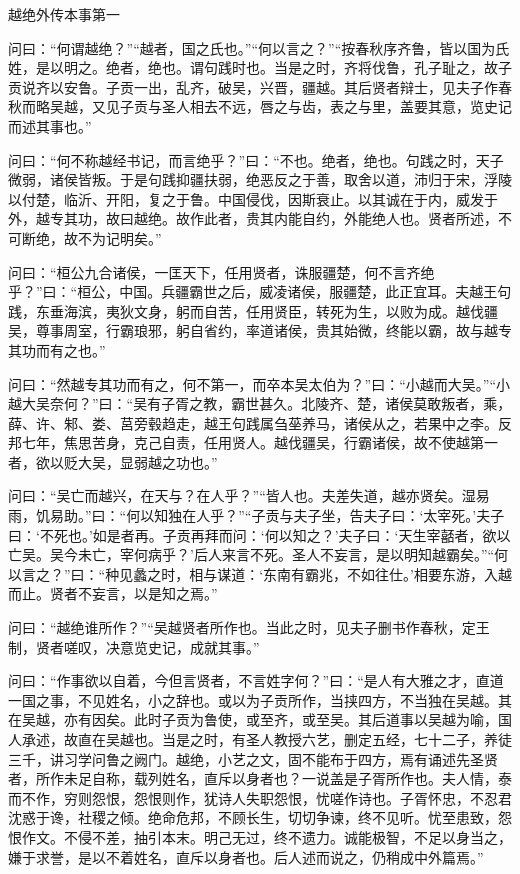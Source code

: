 \documentclass[12pt,UTF8]{ctexbook}
\begin{document}
越绝外传本事第一

问曰：“何谓越绝？”“越者，国之氏也。”“何以言之？”“按春秋序齐鲁，皆以国为氏姓，是以明之。绝者，绝也。谓句践时也。当是之时，齐将伐鲁，孔子耻之，故子贡说齐以安鲁。子贡一出，乱齐，破吴，兴晋，疆越。其后贤者辩士，见夫子作春秋而略吴越，又见子贡与圣人相去不远，唇之与齿，表之与里，盖要其意，览史记而述其事也。”

问曰：“何不称越经书记，而言绝乎？”曰：“不也。绝者，绝也。句践之时，天子微弱，诸侯皆叛。于是句践抑疆扶弱，绝恶反之于善，取舍以道，沛归于宋，浮陵以付楚，临沂、开阳，复之于鲁。中国侵伐，因斯衰止。以其诚在于内，威发于外，越专其功，故曰越绝。故作此者，贵其内能自约，外能绝人也。贤者所述，不可断绝，故不为记明矣。”

问曰：“桓公九合诸侯，一匡天下，任用贤者，诛服疆楚，何不言齐绝乎？”曰：“桓公，中国。兵疆霸世之后，威凌诸侯，服疆楚，此正宜耳。夫越王句践，东垂海滨，夷狄文身，躬而自苦，任用贤臣，转死为生，以败为成。越伐疆吴，尊事周室，行霸琅邪，躬自省约，率道诸侯，贵其始微，终能以霸，故与越专其功而有之也。”

问曰：“然越专其功而有之，何不第一，而卒本吴太伯为？”曰：“小越而大吴。”“小越大吴奈何？”曰：“吴有子胥之教，霸世甚久。北陵齐、楚，诸侯莫敢叛者，乘，薛、许、邾、娄、莒旁毂趋走，越王句践属刍莝养马，诸侯从之，若果中之李。反邦七年，焦思苦身，克己自责，任用贤人。越伐疆吴，行霸诸侯，故不使越第一者，欲以贬大吴，显弱越之功也。”

问曰：“吴亡而越兴，在天与？在人乎？”“皆人也。夫差失道，越亦贤矣。湿易雨，饥易助。”曰：“何以知独在人乎？”“子贡与夫子坐，告夫子曰：‘太宰死。’夫子曰：‘不死也。’如是者再。子贡再拜而问：‘何以知之？’夫子曰：‘天生宰嚭者，欲以亡吴。吴今未亡，宰何病乎？’后人来言不死。圣人不妄言，是以明知越霸矣。”“何以言之？”曰：“种见蠡之时，相与谋道：‘东南有霸兆，不如往仕。’相要东游，入越而止。贤者不妄言，以是知之焉。”

问曰：“越绝谁所作？”“吴越贤者所作也。当此之时，见夫子删书作春秋，定王制，贤者嗟叹，决意览史记，成就其事。”

问曰：“作事欲以自着，今但言贤者，不言姓字何？”曰：“是人有大雅之才，直道一国之事，不见姓名，小之辞也。或以为子贡所作，当挟四方，不当独在吴越。其在吴越，亦有因矣。此时子贡为鲁使，或至齐，或至吴。其后道事以吴越为喻，国人承述，故直在吴越也。当是之时，有圣人教授六艺，删定五经，七十二子，养徒三千，讲习学问鲁之阙门。越绝，小艺之文，固不能布于四方，焉有诵述先圣贤者，所作未足自称，载列姓名，直斥以身者也？一说盖是子胥所作也。夫人情，泰而不作，穷则怨恨，怨恨则作，犹诗人失职怨恨，忧嗟作诗也。子胥怀忠，不忍君沈惑于谗，社稷之倾。绝命危邦，不顾长生，切切争谏，终不见听。忧至患致，怨恨作文。不侵不差，抽引本末。明己无过，终不遗力。诚能极智，不足以身当之，嫌于求誉，是以不着姓名，直斥以身者也。后人述而说之，仍稍成中外篇焉。”
\end{document}
